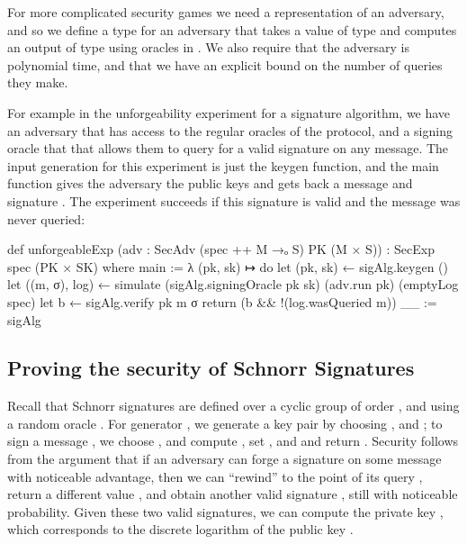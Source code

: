 For more complicated security games we need a representation of an adversary, and so we define a type  for an adversary that takes a value of type  and computes an output of type  using oracles in .
We also require that the adversary is polynomial time, and that we have an explicit bound on the number of queries they make.

For example in the unforgeability experiment for a signature algorithm, we have an adversary that has access to the regular oracles  of the protocol, and a signing oracle  that that allows them to query for a valid signature on any message.
The input generation for this experiment is just the keygen function, and the main function gives the adversary the public keys and gets back a message  and signature .
The experiment succeeds if this signature is valid and the message was never queried:
\begin{leancode}
  def unforgeableExp (adv : SecAdv (spec ++ M →ₒ S) PK (M × S)) :
      SecExp spec (PK × SK) where
    main := λ (pk, sk) ↦ do
      let (pk, sk) ← sigAlg.keygen ()
      let ((m, σ), log) ←
        simulate (sigAlg.signingOracle pk sk) (adv.run pk) (emptyLog spec)
      let b ← sigAlg.verify pk m σ
      return (b && !(log.wasQueried m))
    __ := sigAlg
\end{leancode}

\subsection{Proving the security of Schnorr Signatures}
\label{sec:schnorr}

Recall that Schnorr signatures are defined over a cyclic group  of order , and using a random oracle .
For generator , we generate a key pair by choosing ,   and ; to sign a message , we choose , and compute , set , and  and return .
Security follows from the argument that if an adversary  can forge a signature  on some message  with noticeable advantage, then we can ``rewind''  to the point of its query , return a different value , and obtain another valid signature , still with noticeable probability.
Given these two valid signatures, we can compute the private key , which corresponds to the discrete logarithm of the public key .

